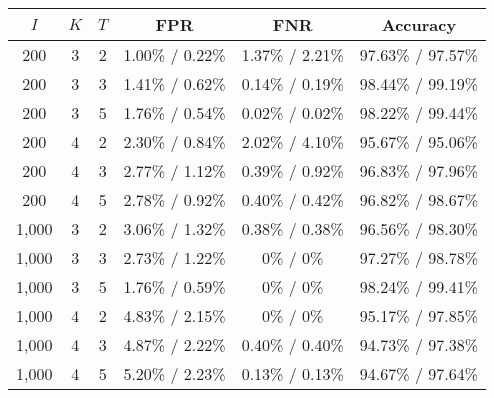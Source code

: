 \begin{tabular}{cccccc}
\hline
$I$ & $K$ & $T$ & FPR & FNR & Accuracy \\
\hline
200 & 3 & 2 & 1.00\% / 0.22\% & 1.37\% / 2.21\% & 97.63\% / 97.57\% \\
200 & 3 & 3 & 1.41\% / 0.62\% & 0.14\% / 0.19\% & 98.44\% / 99.19\% \\
200 & 3 & 5 & 1.76\% / 0.54\% & 0.02\% / 0.02\% & 98.22\% / 99.44\% \\
200 & 4 & 2 & 2.30\% / 0.84\% & 2.02\% / 4.10\% & 95.67\% / 95.06\% \\
200 & 4 & 3 & 2.77\% / 1.12\% & 0.39\% / 0.92\% & 96.83\% / 97.96\% \\
200 & 4 & 5 & 2.78\% / 0.92\% & 0.40\% / 0.42\% & 96.82\% / 98.67\% \\
1,000 & 3 & 2 & 3.06\% / 1.32\% & 0.38\% / 0.38\% & 96.56\% / 98.30\% \\
1,000 & 3 & 3 & 2.73\% / 1.22\% & 0\% / 0\% & 97.27\% / 98.78\% \\
1,000 & 3 & 5 & 1.76\% / 0.59\% & 0\% / 0\% & 98.24\% / 99.41\% \\
1,000 & 4 & 2 & 4.83\% / 2.15\% & 0\% / 0\% & 95.17\% / 97.85\% \\
1,000 & 4 & 3 & 4.87\% / 2.22\% & 0.40\% / 0.40\% & 94.73\% / 97.38\% \\
1,000 & 4 & 5 & 5.20\% / 2.23\% & 0.13\% / 0.13\% & 94.67\% / 97.64\% \\
\hline
\end{tabular}

